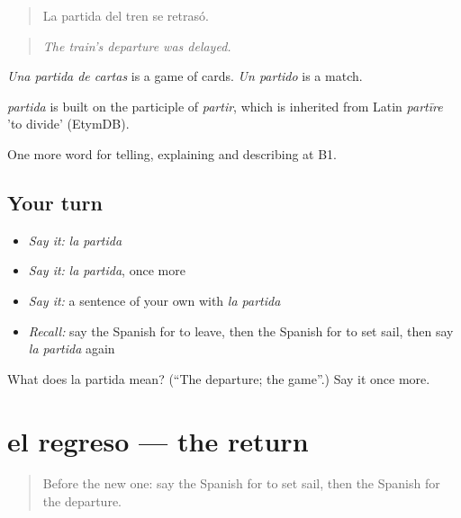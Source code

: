 \begin{quote}
La partida del tren se retrasó.
\end{quote}

\begin{quote}
\emph{The train's departure was delayed.}
\end{quote}

\emph{Una partida de cartas} is a game of cards. \emph{Un partido} is a match.

\begin{cousinweb}
\emph{partida} is built on the participle of \emph{partir}, which is inherited from Latin \emph{partīre} 'to divide' (EtymDB).
\end{cousinweb}

\begin{grammarlens}[title={What you've built}]
One more word for telling, explaining and describing at B1.
\end{grammarlens}

\subsection*{Your turn}
\begin{itemize}
\raggedright
  \item \emph{Say it:} \emph{la partida}
  \item \emph{Say it:} \emph{la partida}, once more
  \item \emph{Say it:} a sentence of your own with \emph{la partida}
  \item \emph{Recall:} say the Spanish for to leave, then the Spanish for to set sail, then say \emph{la partida} again
\end{itemize}

\begin{tcolorbox}[breakable,colback=teal!4,colframe=teal!35!black,title={Before you move on}]
What does la partida mean? (\textquotedblleft{}The departure; the game\textquotedblright{}.) Say it once more.
\end{tcolorbox}
\section[el regreso]{el regreso — the return}

\label{lesson:ES-C561-regreso}



\begin{quote}
Before the new one: say the Spanish for to set sail, then the Spanish for the departure.
\end{quote}

